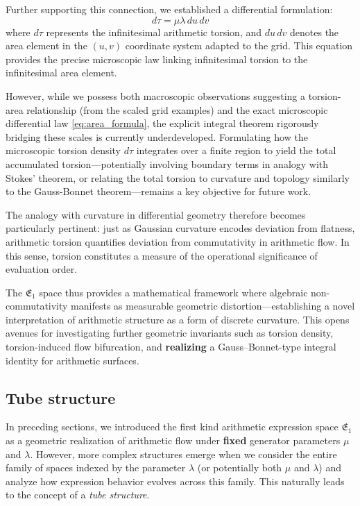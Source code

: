 Further supporting this connection, we established a differential formulation:
\begin{equation}
    d\tau = \mu \lambda\, du\, dv \label{eq:area_formula}
\end{equation}
where $d\tau$ represents the infinitesimal arithmetic torsion, and $du\, dv$ denotes the area element in the $(u, v)$ coordinate system adapted to the grid. This equation provides the precise microscopic law linking infinitesimal torsion to the infinitesimal area element.

However, while we possess both macroscopic observations suggesting a torsion-area relationship (from the scaled grid examples) and the exact microscopic differential law \eqref{eq:area_formula}, the explicit integral theorem rigorously bridging these scales is currently underdeveloped. Formulating how the microscopic torsion density $d\tau$ integrates over a finite region to yield the total accumulated torsion—potentially involving boundary terms in analogy with Stokes' theorem, or relating the total torsion to curvature and topology similarly to the Gauss-Bonnet theorem—remains a key objective for future work.

The analogy with curvature in differential geometry therefore becomes particularly pertinent: just as Gaussian curvature encodes deviation from flatness, arithmetic torsion quantifies deviation from commutativity in arithmetic flow. In this sense, torsion constitutes a measure of the operational significance of evaluation order.

The $\mathfrak{E}_1$ space thus provides a mathematical framework where algebraic non-commutativity manifests as measurable geometric distortion—establishing a novel interpretation of arithmetic structure as a form of discrete curvature. This opens avenues for investigating further geometric invariants such as torsion density, torsion-induced flow bifurcation, and \textbf{realizing} a Gauss–Bonnet-type integral identity for arithmetic surfaces.

\subsection{Tube structure}\label{sec:tubestructure}

In preceding sections, we introduced the first kind arithmetic expression space $\mathfrak{E}_1$ as a geometric realization of arithmetic flow under \textbf{fixed} generator parameters $\mu$ and $\lambda$. However, more complex structures emerge when we consider the entire family of spaces indexed by the parameter $\lambda$ (or potentially both $\mu$ and $\lambda$) and analyze how expression behavior evolves across this family. This naturally leads to the concept of a \emph{tube structure}.

